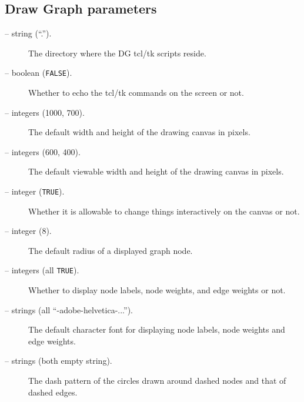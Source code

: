 \subsection{Draw Graph parameters}
\begin{description}

\item[ -- string (``.'').] 
The directory where the DG tcl/tk scripts reside.

\item[ -- boolean ({\tt FALSE}).]
Whether to echo the tcl/tk commands on the screen or not.

\item[ -- integers (1000, 700).]
The default width and height of the drawing canvas in pixels.

\item[ -- integers (600, 400).]
The default viewable width and height of the drawing canvas in pixels.

\item[ -- integer ({\tt TRUE}).] 
Whether it is allowable to change things interactively on the canvas or not.

\item[ -- integer (8).] 
The default radius of a displayed graph node.

\item[ -- integers
(all {\tt TRUE}).] 
Whether to display node labels, node weights, and edge weights or not.

\item[ -- strings
(all ``-adobe-helvetica-...'').] 
The default character font for displaying node labels, node weights and edge
weights. 

\item[ -- strings (both empty string).] 
The dash pattern of the circles drawn around dashed nodes and that of
dashed edges.

\end{description}

